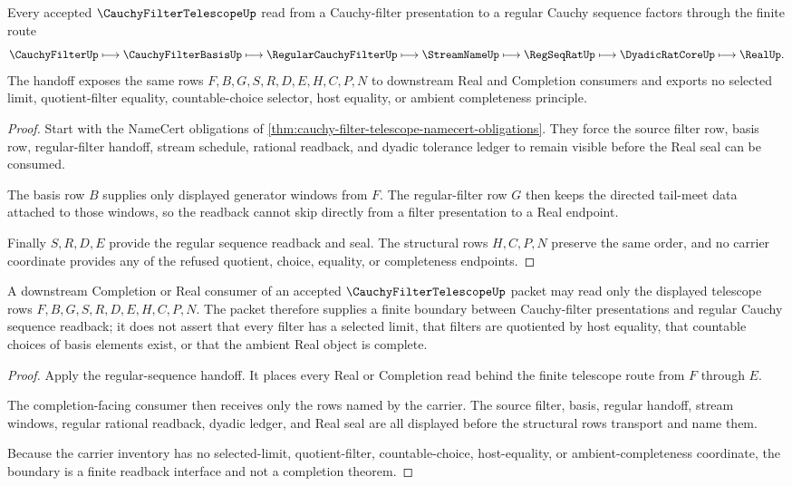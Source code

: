 \begin{theorem}
\label{thm:cauchy-filter-telescope-regular-sequence-handoff}
Every accepted $\CauchyFilterTelescopeUp$ read from a Cauchy-filter presentation to a regular Cauchy sequence factors through the finite route
$$
\CauchyFilterUp \longmapsto \CauchyFilterBasisUp \longmapsto \RegularCauchyFilterUp \longmapsto \StreamNameUp \longmapsto \RegSeqRatUp \longmapsto \DyadicRatCoreUp \longmapsto \RealUp .
$$
The handoff exposes the same rows $F,B,G,S,R,D,E,H,C,P,N$ to downstream Real and Completion consumers and exports no selected limit, quotient-filter equality, countable-choice selector, host equality, or ambient completeness principle.
\end{theorem}
\begin{proof}
Start with the NameCert obligations of \autoref{thm:cauchy-filter-telescope-namecert-obligations}. They force the source filter row, basis row, regular-filter handoff, stream schedule, rational readback, and dyadic tolerance ledger to remain visible before the Real seal can be consumed.

The basis row $B$ supplies only displayed generator windows from $F$. The regular-filter row $G$ then keeps the directed tail-meet data attached to those windows, so the readback cannot skip directly from a filter presentation to a Real endpoint.

Finally $S,R,D,E$ provide the regular sequence readback and seal. The structural rows $H,C,P,N$ preserve the same order, and no carrier coordinate provides any of the refused quotient, choice, equality, or completeness endpoints.
\end{proof}

\begin{theorem}
\label{thm:cauchy-filter-telescope-completion-boundary}
A downstream Completion or Real consumer of an accepted $\CauchyFilterTelescopeUp$ packet may read only the displayed telescope rows $F,B,G,S,R,D,E,H,C,P,N$. The packet therefore supplies a finite boundary between Cauchy-filter presentations and regular Cauchy sequence readback; it does not assert that every filter has a selected limit, that filters are quotiented by host equality, that countable choices of basis elements exist, or that the ambient Real object is complete.
\end{theorem}
\begin{proof}
Apply the regular-sequence handoff. It places every Real or Completion read behind the finite telescope route from $F$ through $E$.

The completion-facing consumer then receives only the rows named by the carrier. The source filter, basis, regular handoff, stream windows, regular rational readback, dyadic ledger, and Real seal are all displayed before the structural rows transport and name them.

Because the carrier inventory has no selected-limit, quotient-filter, countable-choice, host-equality, or ambient-completeness coordinate, the boundary is a finite readback interface and not a completion theorem.
\end{proof}

